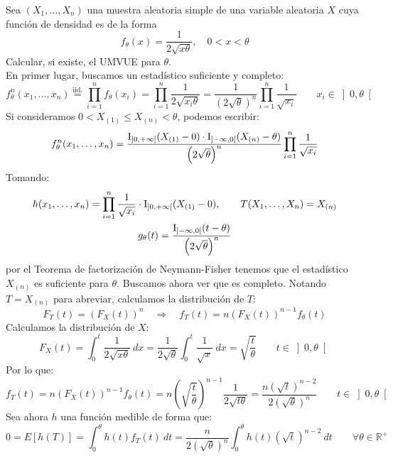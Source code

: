 \begin{ejercicio}
    Sea $(X_1, \ldots, X_n)$ una muestra aleatoria simple de una variable aleatoria $X$ cuya función de densidad es de la forma
    \begin{equation*}
        f_\theta(x) = \dfrac{1}{2\sqrt{x\theta}}, \quad 0<x<\theta
    \end{equation*}
    Calcular, si existe, el UMVUE para $\theta$.\\

    \noindent
    En primer lugar, buscamos un estadístico suficiente y completo:
    \begin{equation*}
        f_\theta^n(x_1, \ldots, x_n) \stackrel{\text{iid.}}{=} \prod_{i=1}^{n}f_\theta(x_i) = \prod_{i=1}^{n}\dfrac{1}{2\sqrt{x_i\theta}} = \dfrac{1}{{\left(2\sqrt{\theta}\right)}^{n}} \prod_{i=1}^{n} \frac{1}{\sqrt{x_i}} \qquad x_i \in \left]0,\theta\right[
    \end{equation*}
    Si consideramos $0< X_{(1)} \leq X_{(n)} < \theta $, podemos escribir:
    \begin{equation*}
        f^n_\theta(x_1, \ldots, x_n) = \dfrac{\operatorname{I}_{\left]0,+\infty\right[}(X_{(1)}-0) \cdot \operatorname{I}_{\left]-\infty,0\right[}(X_{(n)}-\theta)}{{\left(2\sqrt{\theta}\right)}^{n}} \prod_{i=1}^{n}\dfrac{1}{\sqrt{x_i}}
    \end{equation*}
    Tomando:
    \begin{gather*}
        h(x_1, \ldots, x_n) = \prod_{i=1}^{n}\dfrac{1}{\sqrt{x_i}}\cdot \operatorname{I}_{\left]0,+\infty\right[}(X_{(1)}-0)  , \qquad T(X_1, \ldots, X_n) = X_{(n)} \\
        g_\theta(t) = \dfrac{\operatorname{I}_{\left]-\infty,0\right[}(t-\theta)}{{\left(2\sqrt{\theta}\right)}^{n}} 
    \end{gather*}
    por el Teorema de factorización de Neymann-Fisher tenemos que el estadístico $X_{(n)}$ es suficiente para $\theta$. Buscamos ahora ver que es completo. Notando $T=X_{(n)}$ para abreviar, calculamos la distribución de $T$:
    \begin{equation*}
        F_T(t) = {(F_X(t))}^{n} \quad \Longrightarrow \quad  f_T(t) = n{(F_X(t))}^{n-1}f_\theta(t)
    \end{equation*}
    Calculamos la distribución de $X$:
    \begin{equation*}
        F_X(t) = \int_{0}^{t} \dfrac{1}{2\sqrt{x\theta}}~dx = \dfrac{1}{2\sqrt{\theta}}\int_{0}^{t} \dfrac{1}{\sqrt{x}}~dx  = \sqrt{\frac{t}{\theta}} \qquad t \in \left]0,\theta\right[
    \end{equation*}
    Por lo que:
    \begin{equation*}
        f_T(t) = n{(F_X(t))}^{n-1}f_\theta(t) = n{\left(\sqrt{\frac{t}{\theta}}\right)}^{n-1}\frac{1}{2\sqrt{t\theta}} = \dfrac{n{\left(\sqrt{t}\right)}^{n-2}}{2{\left(\sqrt{\theta}\right)}^{n}}\qquad t\in \left]0,\theta\right[
    \end{equation*}
    Sea ahora $h$ una función medible de forma que:
    \begin{equation*}
        0 = E[h(T)] = \int_{0}^{\theta} h(t) f_T(t)~dt = \frac{n}{2{\left(\sqrt{\theta}\right)}^{n}}\int_{0}^{\theta} h(t){\left(\sqrt{t}\right)}^{n-2}~dt  \qquad \forall \theta\in \mathbb{R}^+
    \end{equation*}


\end{ejercicio}

